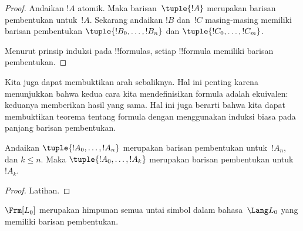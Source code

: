 \documentclass[../../../include/open-logic-section]{subfiles}
\begin{document}
\begin{proof}
Andaikan $!A$ atomik. Maka barisan~$\tuple{!A}$ merupakan barisan
pembentukan untuk~$!A$.
%
Sekarang andaikan $!B$ dan~$!C$ masing-masing memiliki barisan pembentukan
$\tuple{!B_0,\dotsc,!B_n}$ dan $\tuple{!C_0,\dotsc,!C_m}$.
%
\begin{enumerate}
\end{enumerate}
Menurut prinsip induksi pada !!{formula}s, setiap !!{formula} memiliki barisan
pembentukan.
\end{proof}

Kita juga dapat membuktikan arah sebaliknya. Hal ini penting karena
menunjukkan bahwa kedua cara kita mendefinisikan formula adalah ekuivalen:
keduanya memberikan hasil yang sama. Hal ini juga berarti bahwa kita dapat
membuktikan teorema tentang formula dengan menggunakan induksi biasa pada
panjang barisan pembentukan.

\begin{lem}
Andaikan $\tuple{!A_0,\dotsc,!A_n}$ merupakan barisan pembentukan
untuk~$!A_n$, dan $k \leq n$. Maka $\tuple{!A_0,\dotsc,!A_k}$ merupakan
barisan pembentukan untuk~$!A_k$.
\end{lem}

\begin{proof}
Latihan.
\end{proof}

\begin{thm}
$\Frm[L_0]$ merupakan himpunan semua untai simbol dalam bahasa~$\Lang L_0$
yang memiliki barisan pembentukan.
\end{thm}
\end{document}
